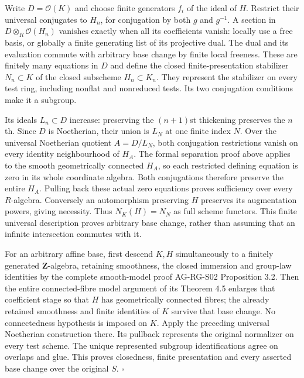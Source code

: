 \documentclass[11pt,a4paper,openany]{report}
\begin{document}
Write \(D=\mathcal O(K)\) and choose finite generators \(f_i\) of the ideal of \(H\). Restrict their universal conjugates to \(H_n\), for conjugation by both \(g\) and \(g^{-1}\). A section in \(D\otimes_R\mathcal O(H_n)\) vanishes exactly when all its coefficients vanish: locally use a free basis, or globally a finite generating list of its projective dual. The dual and its evaluation commute with arbitrary base change by finite local freeness. These are finitely many equations in \(D\) and define the closed finite-presentation stabilizer \(N_n\subset K\) of the closed subscheme \(H_n\subset K_n\). They represent the stabilizer on every test ring, including nonflat and nonreduced tests. Its two conjugation conditions make it a subgroup.

Its ideals \(L_n\subset D\) increase: preserving the \((n+1)\)st thickening preserves the \(n\)th. Since \(D\) is Noetherian, their union is \(L_N\) at one finite index \(N\). Over the universal Noetherian quotient \(A=D/L_N\), both conjugation restrictions vanish on every identity neighbourhood of \(H_A\). The formal separation proof above applies to the smooth geometrically connected \(H_A\), so each restricted defining equation is zero in its whole coordinate algebra. Both conjugations therefore preserve the entire \(H_A\). Pulling back these actual zero equations proves sufficiency over every \(R\)-algebra. Conversely an automorphism preserving \(H\) preserves its augmentation powers, giving necessity. Thus \(N_K(H)=N_N\) as full scheme functors. This finite universal description proves arbitrary base change, rather than assuming that an infinite intersection commutes with it.

For an arbitrary affine base, first descend \(K,H\) simultaneously to a finitely generated \(\mathbf Z\)-algebra, retaining smoothness, the closed immersion and group-law identities by the complete smooth-model proof AG-RG-S02 Proposition 3.2. Then the entire connected-fibre model argument of its Theorem 4.5 enlarges that coefficient stage so that \(H\) has geometrically connected fibres; the already retained smoothness and finite identities of \(K\) survive that base change. No connectedness hypothesis is imposed on \(K\). Apply the preceding universal Noetherian construction there. Its pullback represents the original normalizer on every test scheme. The unique represented subgroup identifications agree on overlaps and glue. This proves closedness, finite presentation and every asserted base change over the original \(S\). \(\square\)
\end{document}
